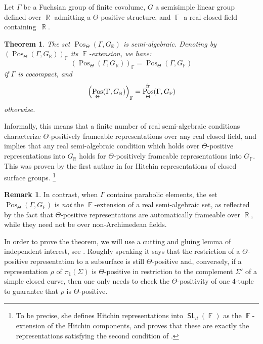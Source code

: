 \documentclass{amsart}
\theoremstyle{plain}
\newtheorem{ThmIntro}{Theorem}
\theoremstyle{definition}
\newtheorem{remark}[proposition]{Remark}
\DeclareMathOperator{\SL}{\mathsf{SL}}
\DeclareMathOperator{\Pos}{Pos}
\DeclareMathOperator{\Fb}{{\mathbb{F}}}
\DeclareMathOperator{\Rb}{{\mathbb{R}}}
\newcommand{\fr}{\textnormal{fr}}
\newcommand{\1}{\mathbf{1}}
\begin{document}
Let $\Gamma$ be a Fuchsian group of finite covolume, $G$ a semisimple linear group defined over $\Rb$ admitting a $\Theta$-positive structure, and $\Fb$ a real closed field containing~$\Rb$.

\begin{ThmIntro} \label{thm-intro: Positivity semi-algebraic}
    The set $\Pos_\Theta(\Gamma,G_{\Rb})$ is semi-algebraic. Denoting by $\left(\Pos_\Theta(\Gamma, G_{\Rb})\right)_{\Fb}$ its $\Fb$-extension, we have:
    \[\left(\Pos_\Theta(\Gamma, G_{\Rb})\right)_{\Fb} = \Pos_\Theta(\Gamma, G_{\Fb})\]
    if $\Gamma$ is cocompact, and
    \[\left(\Pos_\Theta(\Gamma, G_{\Rb})\right)_{\Fb} = \Pos_\Theta^{\fr}(\Gamma, G_{\Fb})\]
    otherwise.
\end{ThmIntro}

Informally, this means that a finite number of real semi-algebraic conditions characterize $\Theta$-positively frameable representations over any real closed field, and implies that any real semi-algebraic condition which holds over $\Theta$-positive representations into $G_{\Rb}$ holds for $\Theta$-positively frameable representations into $G_{\Fb}$. This was proven by the first author in \cite{Flamm} for Hitchin representations of closed surface groups.
\footnote{To be precise, she defines Hitchin representations into $\SL_d(\Fb)$ as the $\Fb$-extension of the Hitchin components, and proves that these are exactly the representations satisfying the second condition of .}

\begin{remark}
    In contrast, when $\Gamma$ contains parabolic elements, the set $\Pos_\Theta(\Gamma,G_{\Fb})$ is \emph{not} the $\Fb$-extension of a real semi-algebraic set, as reflected by the fact that $\Theta$-positive representations are automatically frameable over $\Rb$, while they need not be over non-Archimedean fields.
\end{remark}


In order to prove the theorem, we will use a cutting and gluing lemma of independent interest, see . Roughly speaking it says that the restriction of a $\Theta$-positive representation to a subsurface is still $\Theta$-positive and, conversely, if a representation $\rho$ of $\pi_1(\Sigma)$ is $\Theta$-positive in restriction to the complement $\Sigma'$ of a simple closed curve, then one only needs to check the $\Theta$-positivity of one $4$-tuple to guarantee that $\rho$ is $\Theta$-positive.\\
\end{document}
